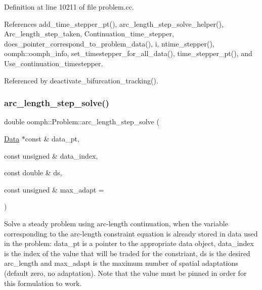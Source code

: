 Definition at line 10211 of file problem.\+cc.



References add\+\_\+time\+\_\+stepper\+\_\+pt(), arc\+\_\+length\+\_\+step\+\_\+solve\+\_\+helper(), Arc\+\_\+length\+\_\+step\+\_\+taken, Continuation\+\_\+time\+\_\+stepper, does\+\_\+pointer\+\_\+correspond\+\_\+to\+\_\+problem\+\_\+data(), i, ntime\+\_\+stepper(), oomph\+::oomph\+\_\+info, set\+\_\+timestepper\+\_\+for\+\_\+all\+\_\+data(), time\+\_\+stepper\+\_\+pt(), and Use\+\_\+continuation\+\_\+timestepper.



Referenced by deactivate\+\_\+bifurcation\+\_\+tracking().

\mbox{\label{classoomph_1_1Problem_aefb723728ed26abe410b61ec38d42688}} 
\subsubsection{\texorpdfstring{arc\+\_\+length\+\_\+step\+\_\+solve()}{arc\_length\_step\_solve()}\hspace{0.1cm}{\footnotesize\ttfamily [2/2]}}
{\footnotesize\ttfamily double oomph\+::\+Problem\+::arc\+\_\+length\+\_\+step\+\_\+solve (\begin{DoxyParamCaption}\item[{\hyperlink{classoomph_1_1Data}{Data} $\ast$const \&}]{data\+\_\+pt,  }\item[{const unsigned \&}]{data\+\_\+index,  }\item[{const double \&}]{ds,  }\item[{const unsigned \&}]{max\+\_\+adapt = {} }\end{DoxyParamCaption})}



Solve a steady problem using arc-\/length continuation, when the variable corresponding to the arc-\/length constraint equation is already stored in data used in the problem\+: data\+\_\+pt is a pointer to the appropriate data object, data\+\_\+index is the index of the value that will be traded for the constriant, ds is the desired arc\+\_\+length and max\+\_\+adapt is the maximum number of spatial adaptations (default zero, no adaptation). Note that the value must be pinned in order for this formulation to work. 

